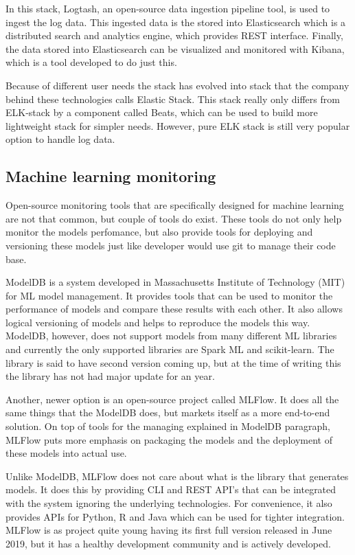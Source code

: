 In this stack, Logtash, an open-source data ingestion pipeline tool, is used to ingest the log data.
This ingested data is the stored into Elasticsearch which is a distributed search and analytics engine, which provides REST interface.
Finally, the data stored into Elasticsearch can be visualized and monitored with Kibana, which is a tool developed to do just this. \cite{elastic}

Because of different user needs the stack has evolved into stack that the company behind these technologies calls Elastic Stack.
This stack really only differs from ELK-stack by a component called Beats, which can be used to build more lightweight stack for simpler needs.
However, pure ELK stack is still very popular option to handle log data. \cite{elastic}

\subsection{Machine learning monitoring}

Open-source monitoring tools that are specifically designed for machine learning are not that common, but couple of tools do exist.
These tools do not only help monitor the models perfomance, but also provide tools for deploying and versioning these models just like developer would use git to manage their code base.

ModelDB is a system developed in Massachusetts Institute of Technology (MIT) for ML model management.
It provides tools that can be used to monitor the performance of models and compare these results with each other.
It also allows logical versioning of models and helps to reproduce the models this way.
ModelDB, however, does not support models from many different ML libraries and currently the only supported libraries are Spark ML and scikit-learn.
The library is said to have second version coming up, but at the time of writing this the library has not had major update for an year.
\cite{modeldb}

Another, newer option is an open-source project called MLFlow.
It does all the same things that the ModelDB does, but markets itself as a more end-to-end solution.
On top of tools for the managing explained in ModelDB paragraph, MLFlow puts more emphasis on packaging the models and the deployment of these models into actual use.
\cite{mlflow}

Unlike ModelDB, MLFlow does not care about what is the library that generates models.
It does this by providing CLI and REST API's that can be integrated with the system ignoring the underlying technologies.
For convenience, it also provides APIs for Python, R and Java which can be used for tighter integration.
MLFlow is as project quite young having its first full version released in June 2019, but it has a healthy development community and is actively developed.
\cite{mlflow}